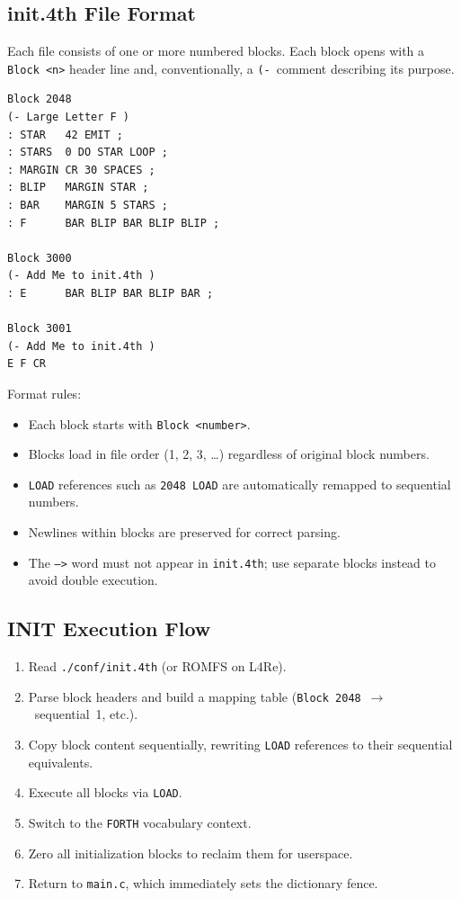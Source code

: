 \subsection{init.4th File Format}

Each file consists of one or more numbered blocks. Each block opens with a
\texttt{Block~<n>} header line and, conventionally, a \texttt{(-}~comment
describing its purpose.

\begin{lstlisting}[language=Forth]
Block 2048
(- Large Letter F )
: STAR   42 EMIT ;
: STARS  0 DO STAR LOOP ;
: MARGIN CR 30 SPACES ;
: BLIP   MARGIN STAR ;
: BAR    MARGIN 5 STARS ;
: F      BAR BLIP BAR BLIP BLIP ;

Block 3000
(- Add Me to init.4th )
: E      BAR BLIP BAR BLIP BAR ;

Block 3001
(- Add Me to init.4th )
E F CR
\end{lstlisting}

Format rules:

\begin{itemize}
  \item Each block starts with \texttt{Block~<number>}.
  \item Blocks load in file order (1, 2, 3, \ldots) regardless of
        original block numbers.
  \item \texttt{LOAD} references such as \texttt{2048~LOAD} are
        automatically remapped to sequential numbers.
  \item Newlines within blocks are preserved for correct parsing.
  \item The \texttt{-->} word must not appear in \texttt{init.4th};
        use separate blocks instead to avoid double execution.
\end{itemize}

\subsection{INIT Execution Flow}

\begin{enumerate}
  \item Read \texttt{./conf/init.4th} (or ROMFS on L4Re).
  \item Parse block headers and build a mapping table
        (\texttt{Block~2048}~$\rightarrow$~sequential~1, etc.).
  \item Copy block content sequentially, rewriting \texttt{LOAD}
        references to their sequential equivalents.
  \item Execute all blocks via \texttt{LOAD}.
  \item Switch to the \texttt{FORTH} vocabulary context.
  \item Zero all initialization blocks to reclaim them for userspace.
  \item Return to \texttt{main.c}, which immediately sets the
        dictionary fence.
\end{enumerate}


